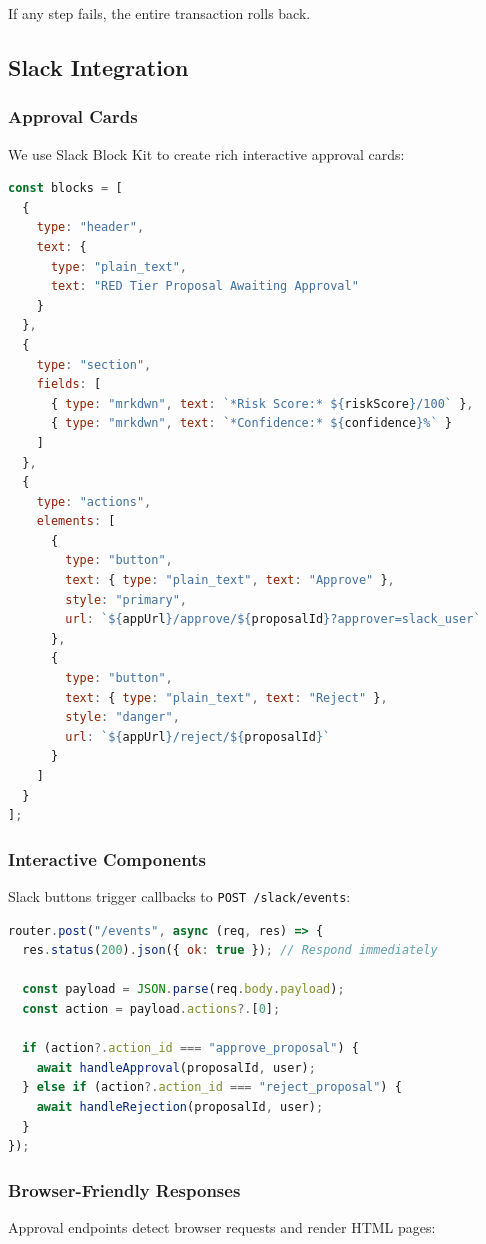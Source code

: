 \documentclass[11pt,a4paper]{article}
\begin{document}
If any step fails, the entire transaction rolls back.

\newpage
\subsection{Slack Integration}

\subsubsection{Approval Cards}
We use Slack Block Kit to create rich interactive approval cards:

\begin{lstlisting}[language=JavaScript,caption=Slack Block Kit (slack.ts)]
const blocks = [
  {
    type: "header",
    text: { 
      type: "plain_text", 
      text: "RED Tier Proposal Awaiting Approval" 
    }
  },
  {
    type: "section",
    fields: [
      { type: "mrkdwn", text: `*Risk Score:* ${riskScore}/100` },
      { type: "mrkdwn", text: `*Confidence:* ${confidence}%` }
    ]
  },
  {
    type: "actions",
    elements: [
      { 
        type: "button", 
        text: { type: "plain_text", text: "Approve" },
        style: "primary",
        url: `${appUrl}/approve/${proposalId}?approver=slack_user`
      },
      {
        type: "button",
        text: { type: "plain_text", text: "Reject" },
        style: "danger",
        url: `${appUrl}/reject/${proposalId}`
      }
    ]
  }
];
\end{lstlisting}

\subsubsection{Interactive Components}
Slack buttons trigger callbacks to \texttt{POST /slack/events}:

\begin{lstlisting}[language=JavaScript,caption=Slack Event Handler (slack.ts)]
router.post("/events", async (req, res) => {
  res.status(200).json({ ok: true }); // Respond immediately
  
  const payload = JSON.parse(req.body.payload);
  const action = payload.actions?.[0];
  
  if (action?.action_id === "approve_proposal") {
    await handleApproval(proposalId, user);
  } else if (action?.action_id === "reject_proposal") {
    await handleRejection(proposalId, user);
  }
});
\end{lstlisting}

\subsubsection{Browser-Friendly Responses}
Approval endpoints detect browser requests and render HTML pages:
\end{document}
